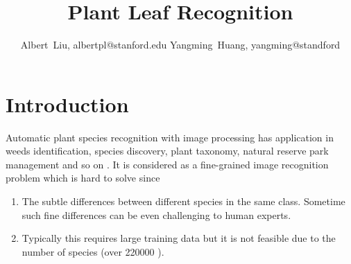 \documentclass[journal, 10pt]{IEEEtran}
\begin{document}
%
\title{Plant Leaf Recognition}
%
%
%
\author{Albert~Liu, albertpl@stanford.edu
        Yangming~Huang, yangming@standford}%

%
%


\maketitle

\section{Introduction}
Automatic plant species recognition with image processing has application in weeds identification, species discovery, plant taxonomy, natural reserve park management and so on \cite{Pedro13}.  It is considered as a fine-grained image recognition problem which is hard to solve since
\begin{enumerate}
  \item The subtle differences between different species in the same class. Sometime such fine differences can be even challenging to human experts.
  \item Typically this requires large training data but it is not feasible due to the number of species (over 220000 \cite{Charles13}).
\end{enumerate}
\end{document}
